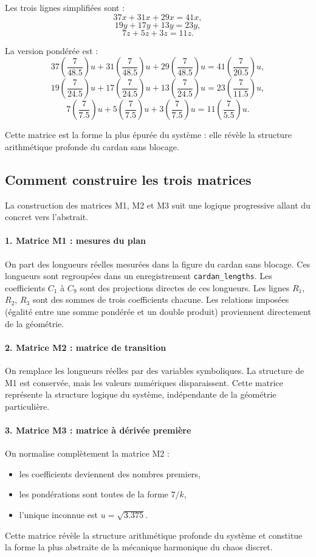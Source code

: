 \documentclass[12pt,a4paper]{article}
\begin{document}
Les trois lignes simplifiées sont :
\[
  37x + 31x + 29x = 41x,
\]
\[
  19y + 17y + 13y = 23y,
\]
\[
   7z +  5z +  3z = 11z.
\]

La version pondérée est :
\[
  37\left(\frac{7}{48.5}\right)u
  + 31\left(\frac{7}{48.5}\right)u
  + 29\left(\frac{7}{48.5}\right)u
  = 41\left(\frac{7}{20.5}\right)u,
\]
\[
  19\left(\frac{7}{24.5}\right)u
  + 17\left(\frac{7}{24.5}\right)u
  + 13\left(\frac{7}{24.5}\right)u
  = 23\left(\frac{7}{11.5}\right)u,
\]
\[
   7\left(\frac{7}{7.5}\right)u
  +  5\left(\frac{7}{7.5}\right)u
  +  3\left(\frac{7}{7.5}\right)u
  = 11\left(\frac{7}{5.5}\right)u.
\]

Cette matrice est la forme la plus épurée du système : elle révèle la structure
arithmétique profonde du cardan sans blocage.

\subsection{Comment construire les trois matrices}

La construction des matrices M1, M2 et M3 suit une logique progressive allant
du concret vers l'abstrait.

\paragraph{1. Matrice M1 : mesures du plan}
On part des longueurs réelles mesurées dans la figure du cardan sans blocage.
Ces longueurs sont regroupées dans un enregistrement \texttt{cardan\_lengths}.
Les coefficients \(C_1\) à \(C_9\) sont des projections directes de ces longueurs.
Les lignes \(R_1\), \(R_2\), \(R_3\) sont des sommes de trois coefficients chacune.
Les relations imposées (égalité entre une somme pondérée et un double produit)
proviennent directement de la géométrie.

\paragraph{2. Matrice M2 : matrice de transition}
On remplace les longueurs réelles par des variables symboliques.
La structure de M1 est conservée, mais les valeurs numériques disparaissent.
Cette matrice représente la structure logique du système, indépendante de la
géométrie particulière.

\paragraph{3. Matrice M3 : matrice à dérivée première}
On normalise complètement la matrice M2 :
\begin{itemize}
  \item les coefficients deviennent des nombres premiers,
  \item les pondérations sont toutes de la forme \(7/k\),
  \item l'unique inconnue est \(u = \sqrt{3.375}\).
\end{itemize}
Cette matrice révèle la structure arithmétique profonde du système et constitue
la forme la plus abstraite de la mécanique harmonique du chaos discret.
\end{document}
